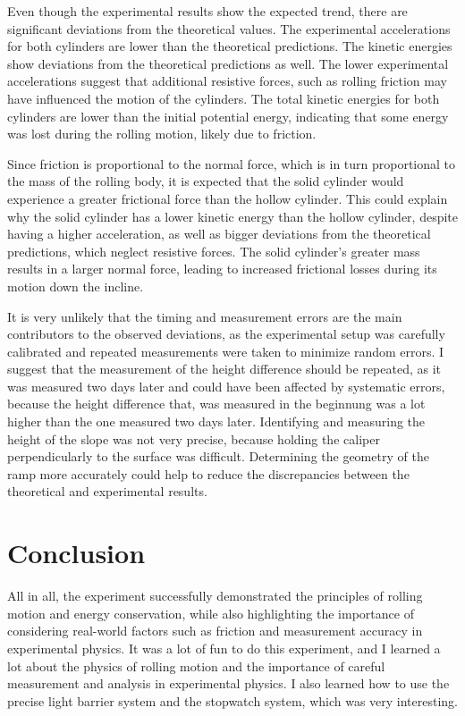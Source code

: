 \documentclass[12pt,a4paper,titlepage]{scrartcl}
\numberwithin{equation}{section}
\numberwithin{table}{section}
\numberwithin{figure}{section}
\begin{document}
Even though the experimental results show the expected trend, there are significant deviations from the theoretical values. The experimental accelerations for both cylinders are lower than the theoretical predictions. The kinetic energies show deviations from the theoretical predictions as well.
The lower experimental accelerations suggest that additional resistive forces, such as rolling friction may have influenced the motion of the cylinders. 
The total kinetic energies for both cylinders are lower than the initial potential energy, indicating that some energy was lost during the rolling motion, likely due to friction.

Since friction is proportional to the normal force, which is in turn proportional to the mass of the rolling body, it is expected that the solid cylinder would experience a greater frictional force than the hollow cylinder. This could explain why the solid cylinder has a lower kinetic energy than the hollow cylinder, despite having a higher acceleration, as well as bigger deviations from the theoretical predictions, which neglect resistive forces. The solid cylinder's greater mass results in a larger normal force, leading to increased frictional losses during its motion down the incline.

It is very unlikely that the timing and measurement errors are the main contributors to the observed deviations, as the experimental setup was carefully calibrated and repeated measurements were taken to minimize random errors. I suggest that the measurement of the height difference should be repeated, as it was measured two days later and could have been affected by systematic errors, because the height difference that, was measured in the beginnung was a lot higher than the one measured two days later. Identifying and measuring the height of the slope was not very precise, because holding the caliper perpendicularly to the surface was difficult. Determining the geometry of the ramp more accurately could help to reduce the discrepancies between the theoretical and experimental results.

\section{Conclusion}
All in all, the experiment successfully demonstrated the principles of rolling motion and energy conservation, while also highlighting the importance of considering real-world factors such as friction and measurement accuracy in experimental physics.
It was a lot of fun to do this experiment, and I learned a lot about the physics of rolling motion and the importance of careful measurement and analysis in experimental physics. I also learned how to use the precise light barrier system and the stopwatch system, which was very interesting.
\end{document}
